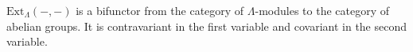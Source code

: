 $\text{Ext}_\Lambda(-, -)$ is a bifunctor from the category of $\Lambda$-modules to the category of abelian groups. It is contravariant in the first variable and covariant in the second variable.
